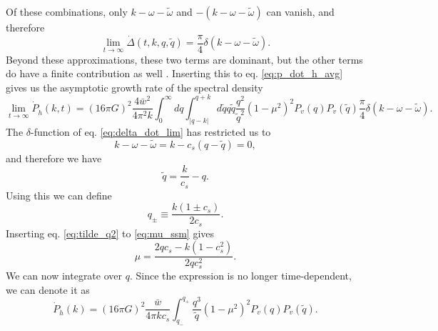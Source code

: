 \fi
Of these combinations, only $k - \omega - \tilde{\omega}$ and $-(k - \omega - \tilde{\omega})$ can vanish,
and therefore
\begin{equation}
\lim_{t\rightarrow\infty} \dot{\Delta}(t,k,q,\tilde{q}) = \frac{\pi}{4} \delta (k - \omega - \tilde{\omega}).
\label{eq:delta_dot_lim}
\end{equation}
Beyond these approximations, these two terms are dominant,
but the other terms do have a finite contribution as well \cites{sharma_shallow_2023}{pol_characterization_2023}.
Inserting this to eq. \eqref{eq:p_dot_h_avg} gives us the asymptotic growth rate of the spectral density
\begin{equation}
\lim_{t \rightarrow \infty} \dot{P}_{\dot{h}}(k,t)
= (16 \pi G)^2 \frac{4 \bar{w}^2}{4 \pi^2 k} \int_0^\infty dq \int_{|q-k|}^{q+k} d\tilde{q} q \tilde{q} \frac{q^2}{\tilde{q}^2} (1 - \mu^2)^2 P_v(q) P_v(\tilde{q}) \frac{\pi}{4} \delta (k - \omega - \tilde{\omega}).
\end{equation}
The $\delta$-function of eq. \eqref{eq:delta_dot_lim} has restricted us to
\begin{equation}
k - \omega - \tilde{\omega} = k - c_s (q - \tilde{q}) = 0,
\end{equation}
and therefore we have
\begin{equation}
\tilde{q} = \frac{k}{c_s} - q.
\label{eq:tilde_q2}
\end{equation}
Using this we can define
\begin{equation}
q_\pm \equiv \frac{k(1 \pm c_s)}{2 c_s}.
\end{equation}
Inserting eq. \eqref{eq:tilde_q2} to \eqref{eq:mu_ssm} gives
\begin{equation}
\mu = \frac{2qc_s - k(1 - c_s^2)}{2qc_s^2}.
\end{equation}
We can now integrate over $q$. Since the expression is no longer time-dependent,
we can denote it as
\begin{equation}
\dot{P}_{\dot{h}}(k) = (16 \pi G)^2 \frac{\bar{w}}{4 \pi k c_s} \int_{q_-}^{q_+} \frac{q^3}{\tilde{q}} (1 - \mu^2)^2 P_v(q) P_v(\tilde{q}).
\label{eq:dot_p_dot_h}
\end{equation}


